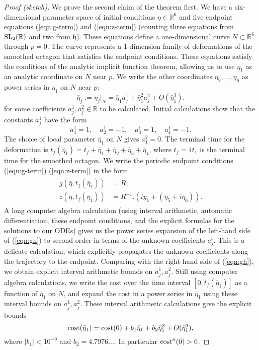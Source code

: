\documentclass{article}
\theoremstyle{remark}
\newcommand{\ring}[1]{\mathbb{#1}}
\newcommand{\op}[1]{\hbox{#1}}
\def\SL{\op{SL}_2(\ring{R})}
\def\h{\mathfrak h}
\begin{document}
\begin{proof}[Proof (sketch)]
We prove the second claim of the theorem first.  We have a
six-dimensional parameter space of initial conditions $\eta\in
\ring{R}^6$ and five endpoint equations (\ref{eqn:g-term}) and
(\ref{eqn:z-term}) (counting three equations from $\SL$ and two from
$\h$).  These equations define a one-dimensional curve $N\subset
\ring{R}^6$ through $p=0$.  The curve represents a $1$-dimension
family of deformations of the smoothed octagon that satisfies the
endpoint conditions.  These equations satisfy the conditions of the
analytic implicit function theorem, allowing us to use $\eta_1$ as an
analytic coordinate on $N$ near $p$.  We write the other coordinates
$\eta_2,\ldots,\eta_6$ as power series in $\eta_1$ on $N$ near $p$:
\begin{equation}\label{eqn:h}
\bar\eta_j := \eta_j|_N  = \bar\eta_1 a_j^1 + 
\bar\eta_1^2 a_j^2 + O(\bar\eta_1^3).
\end{equation}
for some  coefficients $a_j^1,a_j^2\in\ring{R}$ to be
calculated.  Initial calculations show that the constants $a_j^1$
have the form
\[
a_1^1=1,\quad a_2^1=-1,\quad a_3^1=1,\quad a_4^1=-1.
\]
The choice of local parameter $\bar\eta_1$ on $N$
gives $a_1^2=0$.  The terminal
time for the deformation is $t_f(\bar\eta_1) = t_f +
\bar\eta_1+\bar\eta_2+\bar\eta_3+\bar\eta_4$, where $t_f=4t_1$ is the terminal time
for the smoothed octagon.  We write the periodic endpoint conditions
(\ref{eqn:g-term}) (\ref{eqn:z-term}) in the form
\begin{align}\label{eqn:gh}
\begin{split}
g(\bar\eta,t_f(\bar\eta_1)) &= R;\\
z(\bar\eta,t_f(\bar\eta_1)) &= R^{-1}.(i y_1 + (\bar\eta_5+i\bar \eta_6)).
\end{split}
\end{align}
A long computer algebra calculation (using interval arithmetic, automatic
differentiation, these endpoint conditions, and the explicit formulas
for the solutions to our ODEs) gives us the power series expansion of
the left-hand side of (\ref{eqn:gh}) to second order in terms of the
unknown coefficients $a_j^i$.  This is a delicate calculation,
which explicitly propagates the unknown coefficients along the trajectory
to the endpoint. Comparing with the right-hand side of (\ref{eqn:gh}),
we obtain explicit interval arithmetic bounds on $a_j^1,a_j^2$.  Still
using computer algebra calculations, we write the
cost over the time interval $[0,t_f(\bar\eta_1)]$
as a function of $\bar\eta_1$ on $N$, and expand the cost in a power
series in $\bar\eta_1$ using these interval bounds on $a_j^1,a_j^2$.
These interval arithmetic calculations give the explicit bounds
\begin{equation}\label{eqn:local-min}
\op{cost}(\bar\eta_1) = 
\op{cost}(0) + b_1 \bar\eta_1 + b_2 \bar\eta_1^2 + O(\bar\eta_1^3),
\end{equation}
where $|b_1|< 10^{-9}$ and $b_2= 4.7976\ldots$.  
In particular $\op{cost}''(0)>0$.


\end{proof}
\end{document}
